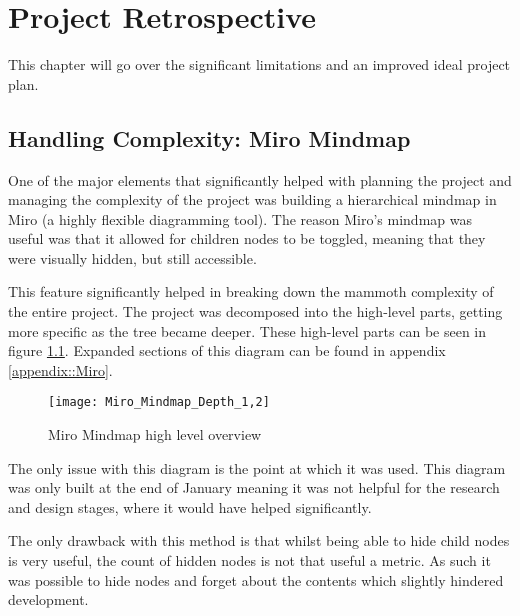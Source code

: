 \chapter{Project Retrospective}
This chapter will go over the significant limitations and an improved ideal project plan.

\section{Handling Complexity: Miro Mindmap}
One of the major elements that significantly helped with planning the project and managing the complexity of the project was building a hierarchical mindmap in Miro (a highly flexible diagramming tool). The reason Miro's mindmap was useful was that it allowed for children nodes to be toggled, meaning that they were visually hidden, but still accessible.

This feature significantly helped in breaking down the mammoth complexity of the entire project. The project was decomposed into the high-level parts, getting more specific as the tree became deeper. These high-level parts can be seen in figure \ref{figure::miro::mindmap_high_level}. Expanded sections of this diagram can be found in appendix \ref{appendix::Miro}.
\begin{figure}
    \texttt{[image: Miro\_Mindmap\_Depth\_1,2]}
    \caption{Miro Mindmap high level overview}
    \label{figure::miro::mindmap_high_level}
\end{figure}

The only issue with this diagram is the point at which it was used. This diagram was only built at the end of January meaning it was not helpful for the research and design stages, where it would have helped significantly.

The only drawback with this method is that whilst being able to hide child nodes is very useful, the count of hidden nodes is not that useful a metric. As such it was possible to hide nodes and forget about the contents which slightly hindered development.

